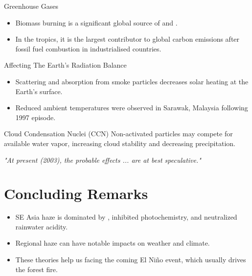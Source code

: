 \documentclass[
11pt,notheorems,hyperref={pdfauthor=whatever}
]{beamer}
\begin{document}
\begin{frame}
    \begin{block}{Greenhouse Gases}
        \begin{itemize}
            \item Biomass burning is a significant global source of  and .
            \item In the tropics, it is the largest contributor to global carbon emissions after fossil fuel combustion in industrialised countries.
        \end{itemize}
    \end{block}

    \begin{block}{Affecting The Earth's Radiation Balance}
        \begin{itemize}
            \item Scattering and absorption from smoke particles decreases solar heating at the Earth's surface.
            \item Reduced ambient temperatures were observed in Sarawak, Malaysia following 1997 episode.
        \end{itemize}
    \end{block}

    \begin{block}{Cloud Condensation Nuclei (CCN)}
        Non-activated particles may compete for available water vapor, increasing cloud stability and decreasing precipitation.
    \end{block}

    \medskip
    \centering
    \textit{"At present (2003), the probable effects ... are at best speculative."}
\end{frame}

\section{Concluding Remarks}
\begin{frame}
    \begin{itemize}
        \item SE Asia haze is dominated by , inhibited photochemistry, and neutralized rainwater acidity.
        \item Regional haze can have notable impacts on weather and climate.
        \item These theories help us facing the coming El Niño event, which usually drives the forest fire.
    \end{itemize}
\end{frame}


\end{document}
